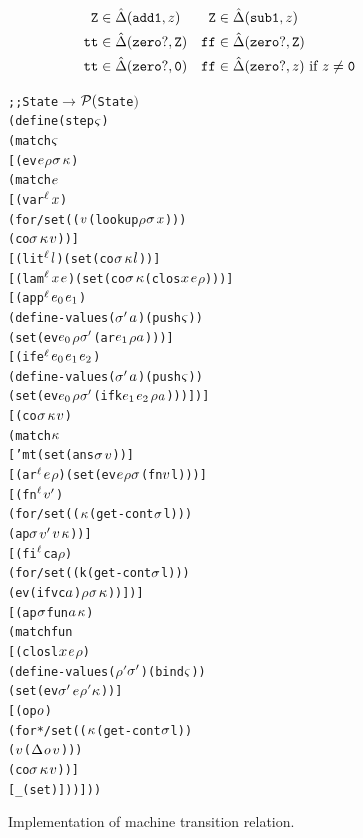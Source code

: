 \documentclass[preprint,onecolumn,9pt]{sigplanconf} %
\begin{document}
\begin{align*}
{\tt Z} &\in \hat{\Delta}({\tt add1},z) &
{\tt Z} &\in \hat{\Delta}({\tt sub1},z)\\
{\tt tt} &\in \hat{\Delta}({\tt zero?},{\tt Z}) &
{\tt ff} &\in \hat{\Delta}({\tt zero?},{\tt Z})\\
{\tt tt} &\in \hat{\Delta}({\tt zero?},{\tt 0}) &
{\tt ff} &\in \hat{\Delta}({\tt zero?},z)\text{ if }z\neq {\tt 0}\\
\end{align*}

\begin{figure}
\begin{alltt}
  ;; State \(\to\) \(\Set(\)State\()\)
  (define (step \(\mstate\))
    (match \(\mstate\)
      [(ev \(\mexp\) \(\rho\) \(\msto\) \(\mkont\))
       (match \(\mexp\)
         [(var\(\superscript\mlab\) \(\mvar\))
          (for/set ((\(\mval\) (lookup \(\rho\) \(\msto\) \(\mvar\))))
            (co \(\msto\) \(\mkont\) \(\mval\)))]
         [(lit\(\superscript\mlab\) \(\mlit\)) (set (co \(\msto\) \(\mkont\) \(\mlit\)))]
         [(lam\(\superscript\mlab\) \(\mvar\) \(\mexp\)) (set (co \(\msto\) \(\mkont\) (clos \(\mvar\) \(\mexp\) \(\rho\))))]
         [(app\(\superscript\mlab\) \(\mexp\subscript0\) \(\mexp\subscript1\))
          (define-values (\(\msto'\) \(\maddr\)) (push \(\mstate\)))
          (set (ev \(\mexp\subscript0\) \(\rho\) \(\msto'\) (ar \(\mexp\subscript1\) \(\rho\) \(\maddr\))))]
         [(ife\(\superscript\mlab\) \(\mexp\subscript0\) \(\mexp\subscript1\) \(\mexp\subscript2\))
          (define-values (\(\msto'\) \(\maddr\)) (push \(\mstate\)))
          (set (ev \(\mexp\subscript0\) \(\rho\) \(\msto'\) (ifk \(\mexp\subscript1\) \(\mexp\subscript2\) \(\rho\) \(\maddr\))))])]
      [(co \(\msto\) \(\mkont\) \(\mval\))
       (match \(\mkont\)
         ['mt (set (ans \(\msto\) \(\mval\)))]
         [(ar\(\superscript\mlab\) \(\mexp\) \(\rho\)) (set (ev \(\mexp\) \(\rho\) \(\msto\) (fn \(\mval\) l)))]
         [(fn\(\superscript\mlab\) \(\mval'\))
          (for/set ((\(\mkont\) (get-cont \(\msto\) l)))
            (ap \(\msto\) \(\mval'\) \(\mval\) \(\mkont\)))]
         [(fi\(\superscript\mlab\) c a \(\rho\))
          (for/set ((k (get-cont \(\msto\) l)))
            (ev (if v c \(\maddr\)) \(\rho\) \(\msto\) \(\mkont\)))])]
      [(ap \(\msto\) fun \(\maddr\) \(\mkont\))
       (match fun
         [(clos l \(\mvar\) \(\mexp\) \(\rho\))
          (define-values (\(\rho'\) \(\msto'\)) (bind \(\mstate\)))
          (set (ev \(\msto'\) \(\mexp\) \(\rho'\) \(\mkont\)))]
         [(op \(\mop\))
          (for*/set ((\(\mkont\) (get-cont \(\msto\) l))
                     (\(\mval\) (\(\interpdelta\) \(\mop\) \(\mval\))))
            (co \(\msto\) \(\mkont\) \(\mval\)))]
         [_ (set)]))]))
\end{alltt}
\caption{Implementation of machine transition relation.}
\end{figure}
\end{document}
